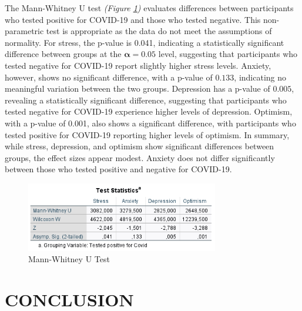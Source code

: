 \documentclass[a4paper]{article}
\begin{document}
\vspace{3em}\noindent
The Mann-Whitney U test \textit{(Figure \ref{fig:mannWhitney})} evaluates differences between participants who tested positive for COVID-19 and those who tested negative.
This non-parametric test is appropriate as the data do not meet the assumptions of normality.\newline
For stress, the p-value is 0.041, indicating a statistically significant difference between groups at the \(\boldsymbol{\alpha = 0.05}\) level,
suggesting that participants who tested negative for COVID-19 report slightly higher stress levels.
Anxiety, however, shows no significant difference, with a p-value of \(\boldsymbol{0.133}\), indicating no meaningful variation between the two groups.
Depression has a p-value of \(\boldsymbol{0.005}\), revealing a statistically significant difference, suggesting that participants who tested negative for COVID-19 experience higher levels of depression.
Optimism, with a p-value of 0.001, also shows a significant difference, with participants who tested positive for COVID-19 reporting higher levels of optimism.
\vspace{0.5em}\newline
In summary, while stress, depression, and optimism show significant differences between groups, the effect sizes appear modest.
Anxiety does not differ significantly between those who tested positive and negative for COVID-19.

\begin{figure}[H]
  \centering
  \caption{Mann-Whitney U Test}
  \label{fig:mannWhitney}
  \includegraphics[width=0.75\textwidth]{img/mann-whitney.png}
\end{figure}

\setlength{\textfloatsep}{50pt}
\section{CONCLUSION}
\vspace{0.5em}
\end{document}
